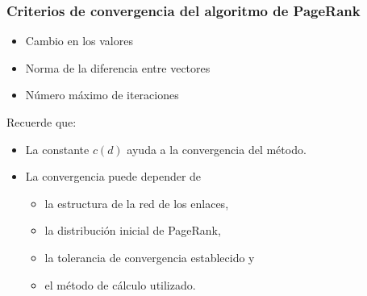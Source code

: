 \documentclass[
10pt, %
aspectratio=169, %
]{beamer}
\begin{document}
	\begin{frame}
		
		\frametitle{Criterios de convergencia del algoritmo de PageRank}
		
		
		\begin{itemize}
			
			\item Cambio en los valores 
			
			\item Norma de la diferencia entre vectores 
			
			\item Número máximo de iteraciones
			
		\end{itemize}
		
		\pause
		\vspace{2\baselineskip}
		
		Recuerde que: 
		\begin{itemize}
			\item La constante $c (d)$ ayuda a la convergencia del método.
			
			\item La convergencia puede depender de
			\begin{itemize}
				\item la estructura de la red de los enlaces,
				\item la distribución inicial de PageRank,
				\item la tolerancia de convergencia establecido y 
				\item el método de cálculo utilizado.
			\end{itemize}
			
		\end{itemize}
		
	\end{frame}
	
\end{document}
